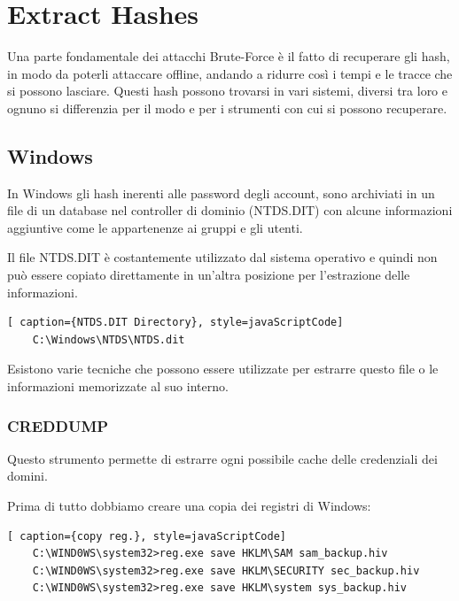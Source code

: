 \chapter{Extract Hashes}
Una parte fondamentale dei attacchi Brute-Force è il fatto di recuperare gli hash, in modo da poterli attaccare offline, andando a ridurre così i tempi e le tracce che si possono lasciare.
Questi hash possono trovarsi in vari sistemi, diversi tra loro e ognuno si differenzia per il modo e per i strumenti con cui si possono recuperare.
\section{Windows}
In Windows gli hash inerenti alle password degli account, sono archiviati in un file di un database nel controller di dominio (NTDS.DIT) con alcune informazioni aggiuntive come le appartenenze ai gruppi e gli utenti.

Il file NTDS.DIT è costantemente utilizzato dal sistema operativo e quindi non può essere copiato direttamente in un'altra posizione per l'estrazione delle informazioni.
\begin{lstlisting}[ caption={NTDS.DIT Directory}, style=javaScriptCode]
    C:\Windows\NTDS\NTDS.dit
\end{lstlisting}

Esistono varie tecniche che possono essere utilizzate per estrarre questo file o le informazioni memorizzate al suo interno.

\subsection{CREDDUMP}

Questo strumento\cite{CREDDUMP} permette di estrarre ogni possibile cache delle credenziali dei domini.

Prima di tutto dobbiamo creare una copia dei registri di Windows:

\begin{lstlisting}[ caption={copy reg.}, style=javaScriptCode]
    C:\WIND0WS\system32>reg.exe save HKLM\SAM sam_backup.hiv
    C:\WIND0WS\system32>reg.exe save HKLM\SECURITY sec_backup.hiv
    C:\WIND0WS\system32>reg.exe save HKLM\system sys_backup.hiv
    \end{lstlisting}


